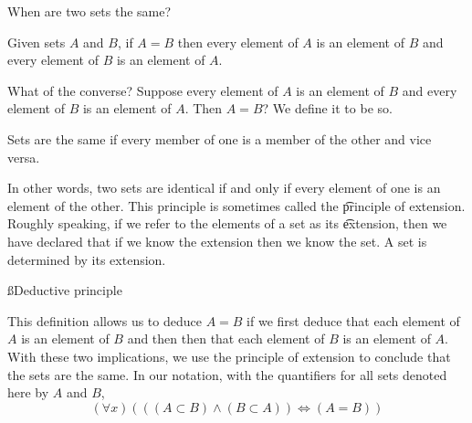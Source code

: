 


When are two sets the same?


Given sets $A$ and $B$, if $A = B$ then every element of $A$ is an element of $B$ and every element of $B$ is an element of $A$.

\begin{account}
\end{account}



What of the converse?
Suppose every element of $A$ is an element of $B$ and every element of $B$ is an element of $A$.
Then $A = B$?
We define it to be so.
\begin{principle}
	Sets are the same if every member of one is a member of the other and vice versa.
\end{principle}
In other words, two sets are identical if and only if every element of one is an element of the other.
This principle is sometimes called the \t{principle of extension}.
Roughly speaking, if we refer to the elements of a set as its \t{extension}, then we have declared that if we know the extension then we know the set.
A set is determined by its extension.

\ss{Deductive principle}

This definition allows us to deduce $A = B$ if we first deduce that each element of $A$ is an element of $B$ and then then that each element of $B$ is an element of $A$.
With these two implications, we use the principle of extension to conclude that the sets are the same.
In our notation, with the quantifiers for all sets denoted here by $A$ and $B$, 
\[
	(\forall x)(((A \subset B) \land (B \subset A)) \iff (A = B))
\]


